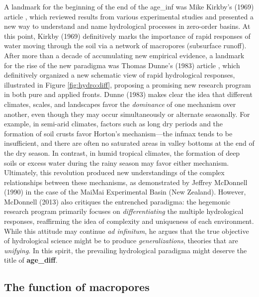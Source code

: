 \documentclass[./main_en.tex]{subfiles}
\begin{document}
\par A landmark for the beginning of the end of the \gls{age_inf} was Mike Kirkby's (1969) article \cite{Kirkby1969}, which reviewed results from various experimental studies and presented a new way to understand and name hydrological processes in zero-order basins. At this point, Kirkby (1969) definitively marks the importance of rapid responses of water moving through the soil via a network of macropores (subsurface runoff). After more than a decade of accumulating new empirical evidence, a landmark for the rise of the new \gls{paradigma} was Thomas Dunne's (1983) article \cite{Dunne1983}, which definitively organized a new schematic view of rapid hydrological responses, illustrated in Figure \ref{fig:hydro:diff}, proposing a promising new research program in both pure and applied fronts. Dunne (1983) makes clear the idea that different climates, scales, and landscapes favor the \textit{dominance} of one mechanism over another, even though they may occur simultaneously or alternate seasonally. For example, in semi-arid climates, factors such as long dry periods and the formation of soil crusts favor Horton’s mechanism—the \gls{infmax} tends to be insufficient, and there are often no saturated areas in valley bottoms at the end of the dry season. In contrast, in humid tropical climates, the formation of deep soils or excess water during the rainy season may favor either mechanism. Ultimately, this revolution produced new understandings of the complex relationships between these mechanisms, as demonstrated by Jeffrey McDonnell (1990) \cite{mcdonnell1990} in the case of the MaiMai Experimental Basin (New Zealand). However, McDonnell (2013) \cite{Mcdonnell2013} also critiques the entrenched \gls{paradigma}: the hegemonic research program primarily focuses on \textit{differentiating} the multiple hydrological responses, reaffirming the idea of complexity and uniqueness of each environment. While this attitude may continue \textit{ad infinitum}, he argues that the true objective of hydrological science might be to produce \textit{generalizations}, theories that are \textit{unifying}. In this spirit, the prevailing hydrological \gls{paradigma} might deserve the title of \textbf{\gls{age_diff}}.

\subsection{The function of macropores}
\end{document}
